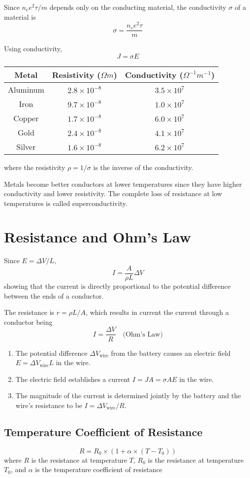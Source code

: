 \documentclass{article}
\begin{document}
Since $n_e e^2 \tau / m$ depends only on the conducting material, the conductivity $\sigma$ of a
material is
\[\sigma = \frac{n_e e^2 \tau}{m}\]

Using conductivity,\
\[J=\sigma E\]

\begin{center}
\begin{tabular}{|c c c|} 
    \hline
    Metal & Resistivity ($\Omega m$) & Conductivity ($\Omega^{-1} m^{-1}$) \\ [0.5ex]
    \hline
    Aluminum & $2.8\times 10^{-8}$ & $3.5\times 10^7$ \\
    \hline
    Iron & $9.7\times 10^{-8}$ & $1.0\times 10^7$ \\
    \hline
    Copper & $1.7 \times 10^{-8}$ & $6.0\times 10^7$ \\
    \hline
    Gold & $2.4\times 10^{-8}$ & $4.1\times 10^7$ \\
    \hline
    Silver & $1.6\times 10^{-8}$ & $6.2\times 10^7$ \\
    \hline
\end{tabular}
\end{center}
where the resistivity $\rho = 1/\sigma$ is the inverse of the conductivity.

\vspace{1em}

Metals become better conductors at lower temperatures since they have higher conductivity and lower
resistivity. The complete loss of resistance at low temperatures is called superconductivity.

\section*{Resistance and Ohm's Law}
Since $E=\Delta V / L$,
\[I=\frac{A}{\rho L}\Delta V\] showing that the current is directly proportional to the potential
difference between the ends of a conductor.

\vspace{1em}

The resistance is $r=\rho L / A$, which results in current the current through a conductor being
\[I=\frac{\Delta V}{R}\quad\text{(Ohm's Law)}\]

\begin{enumerate}
    \item The potential difference $\Delta V_\text{wire}$ from the battery causes an electric field
    $E=\Delta V_\text{wire} L$ in the wire.
    \item The electric field establishes a current $I=JA=\sigma AE$ in the wire.
    \item The magnitude of the current is determined jointly by the battery and the wire's
    resistance to be $I=\Delta V_\text{wire}/R$.
\end{enumerate}

\subsection*{Temperature Coefficient of Resistance}
\[R=R_0\times (1+\alpha \times (T-T_0))\]
where $R$ is the resistance at temperature $T$, $R_0$ is the resistance at temperature $T_0$, and $\alpha$ is the temperature coefficient of resistance
\end{document}
